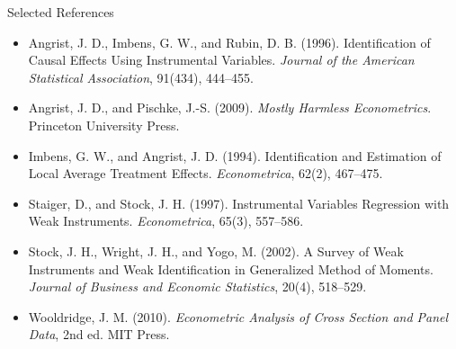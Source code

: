 \documentclass[aspectratio=169,11pt]{beamer}
\begin{document}
\begin{frame}{Selected References}
\small
\begin{itemize}
\item Angrist, J. D., Imbens, G. W., and Rubin, D. B. (1996). Identification of Causal Effects Using Instrumental Variables. \textit{Journal of the American Statistical Association}, 91(434), 444--455.
\item Angrist, J. D., and Pischke, J.-S. (2009). \textit{Mostly Harmless Econometrics}. Princeton University Press.
\item Imbens, G. W., and Angrist, J. D. (1994). Identification and Estimation of Local Average Treatment Effects. \textit{Econometrica}, 62(2), 467--475.
\item Staiger, D., and Stock, J. H. (1997). Instrumental Variables Regression with Weak Instruments. \textit{Econometrica}, 65(3), 557--586.
\item Stock, J. H., Wright, J. H., and Yogo, M. (2002). A Survey of Weak Instruments and Weak Identification in Generalized Method of Moments. \textit{Journal of Business and Economic Statistics}, 20(4), 518--529.
\item Wooldridge, J. M. (2010). \textit{Econometric Analysis of Cross Section and Panel Data}, 2nd ed. MIT Press.
\end{itemize}
\end{frame}

\contactslide
\end{document}
